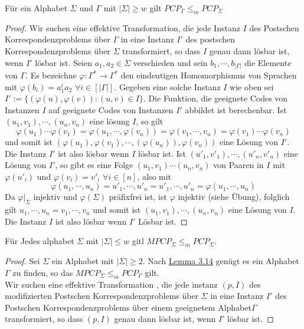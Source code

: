     Für ein Alphabet \(\Sigma\) und \(\Gamma\) mit \(|\Sigma| \geq w\) gilt \(PCP_{\Gamma} \leq_m PCP_{\Sigma}\)
    \begin{proof}
      Wir suchen eine effektive Transformation, die jede Instanz \(I\) des Postschen Korrespondenzproblems über \(\Gamma\) in eine Instanz \(I'\) des postschen Korrespondenzproblems über \(\Sigma\) transformiert, so dass \(I\) genau dann lösbar ist, wenn \(I'\) lösbar ist. Seien \(a_1, a_2 \in \Sigma\) verschieden und sein \(b_1, \cdots, b_{|\Gamma|}\) die Elemente von \(\Gamma\). Es bezeichne \(\varphi : \Gamma^* \to \Gamma^*\) den eindeutigen Homomorphismus von Sprachen mit \(\varphi (b_i) = a^i_1 a_2\) \(\forall i \in [|\Gamma|]\). Gegeben eine solche Instanz \(I\) wie oben sei \(I' := \{(\varphi(u), \varphi(v)) : (u, v) \in I\}\). Die Funktion, die geeignete Codes von Instanzen \(I\) auf geeignete Codes von Instanzen \(I'\) abbildet ist berechenbar. Ist \((u_1, v_1), \cdots, (u_n, v_n)\) eine lösung \(I\), so gilt \[\varphi(u_1) \cdots \varphi(v_1) = \varphi(u_1, \cdots, \varphi(v_n)) = \varphi(v_1, \cdots, v_n) = \varphi(v_1) \cdots \varphi(v_n)\] und somit ist \((\varphi(u_1), \varphi(v_1), \cdots, (\varphi(u_n)), \varphi(v_n))\) eine Lösung von \(I'\). Die Instanz \(I'\) ist also lösbar wenn \(I\) lösbar ist. Ist \((u'_1, v'_1), \cdots, (u'_n, v'_n)\) eine Lösung von \(I'\), so gibt es eine Folge \((u_1, v_1)\cdots (u_n, v_n)\) von Paaren in \(I\) mit \(\varphi(u'_i)\) und \(\varphi(v_i) = v'_i\) \(\forall i \in [n]\), also mit \[\varphi(u_1, \cdots, u_n) = u'_1, \cdots, u'_n = u'_1, \cdots, u'_n =\varphi(u_1, \cdots, u_n)\] Da \(\varphi \vert_{\Sigma}\) injektiv und \(\varphi (\Sigma)\) präfixfrei ist, ist \(\varphi\) injektiv (siehe Übung), folglich gilt \(u_1, \cdots, u_n = v_1, \cdots, v_n\) und somit ist \((u_1, v_1), \cdots, (u_n, v_n)\) eine Lösung von \(I\). Die Instanz \(I\) ist also lösbar wenn \(I'\) Lösbar ist.
    \end{proof}

    Für Jedes alphabet \(\Sigma\) mit \(|\Sigma| \leq w\) gitl \(MPCP_{\Sigma} \leq_m PCP_{\Sigma}\).
    \begin{proof}
      Sei \(\Sigma\) ein Alphabet mit \(|\Sigma| \geq 2\). Nach \hyperref[subsec:3.14]{Lemma 3.14}  genügt es ein Alphabet \(\Gamma\) zu finden, so das \(MPCP_{\Sigma} \leq_m PCP_{\Gamma}\) gilt. \\Wir suchen eine effektive Transformation , die jede instanz \((p, I)\) des modifizierten Postschen Korrespondenzproblems über \(\Sigma\) in eine Instanz \(I'\) des Postschen Korrespondenzproblems über einem geeignetem Alphabet\(\Gamma\) transformiert, so dass \((p, I)\) genau dann lösbar ist, wenn \(I'\) lösbar ist.
    \end{proof}
